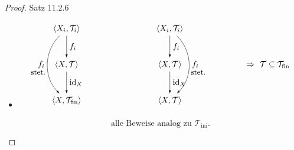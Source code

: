 \begin{proof}{Satz 11.2.6}\\
    \begin{itemize}
        \item["$(ii)\Rightarrow$(i)"] 
        $$
\begin{tikzpicture}[>=latex,scale=1.1]

\node (XiL)   at (-2,1.4) {$\langle X_i,\mathcal T_i\rangle$};
\node (XT)    at (-2,0)   {$\langle X,\mathcal T\rangle$};
\node (XTfin) at (-2,-1.4){$\langle X,\mathcal T_{\mathrm{fin}}\rangle$};

\draw[->] (XiL) -- (XT)    node[midway,right] {$f_i$};
\draw[->] (XT)  -- (XTfin) node[midway,right] {$\mathrm{id}_X$};


\node at (-3.1,-0.3) {\small stet.};


\node (XiR)   at (2,1.4) {$\langle X_i,\mathcal T_i\rangle$};
\node (XT2)   at (2,0)   {$\langle X,\mathcal T\rangle$};
\node (XT3)   at (2,-1.4){$\langle X,\mathcal T\rangle$};

\draw[->] (XiL) to[bend right=45] node[midway, left] {$f_i$} (XTfin);
\draw[->] (XiR) to[bend left=45] node[midway, right] {$f_i$} (XT3);

\draw[->] (XiR) -- (XT2)    node[midway,right] {$f_i$};
\draw[->] (XT2)  -- (XT3) node[midway,right] {$\mathrm{id}_X$};

\node at (3.1,-0.3) {\small stet.};


\node at (5.8,0) {$\Rightarrow\ \mathcal T \subseteq \mathcal T_{\mathrm{fin}}$};

\end{tikzpicture}
$$

$$
\text{alle Beweise analog zu }\mathcal T_{\mathrm{ini}}.
$$
    \end{itemize}
\end{proof}